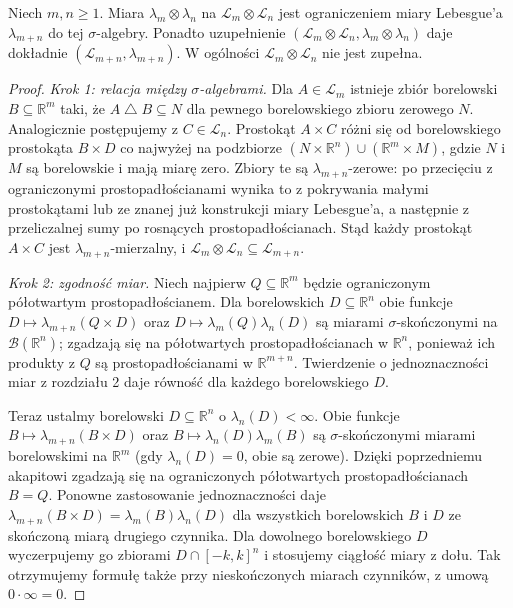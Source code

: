\begin{twierdzenie}
\label{thm:lebesgue-products-12}
Niech $m,n\ge1$. Miara $\lambda_m\otimes\lambda_n$
na $\mathcal L_m\otimes\mathcal L_n$ jest ograniczeniem
miary Lebesgue'a $\lambda_{m+n}$ do tej
$\sigma$-algebry. Ponadto uzupełnienie
$(\mathcal L_m\otimes\mathcal L_n,
\lambda_m\otimes\lambda_n)$ daje dokładnie
$(\mathcal L_{m+n},\lambda_{m+n})$.
W ogólności $\mathcal L_m\otimes\mathcal L_n$
nie jest zupełna.
\end{twierdzenie}
\begin{proof}
\emph{Krok 1: relacja między $\sigma$-algebrami.}
Dla $A\in\mathcal L_m$ istnieje zbiór borelowski
$B\subseteq\mathbb R^m$ taki, że
$A\mathbin\triangle B\subseteq N$ dla pewnego
borelowskiego zbioru zerowego $N$.
Analogicznie postępujemy z $C\in\mathcal L_n$.
Prostokąt $A\times C$ różni się od
borelowskiego prostokąta $B\times D$ co najwyżej
na podzbiorze
$(N\times\mathbb R^n)\cup(\mathbb R^m\times M)$,
gdzie $N$ i $M$ są borelowskie i mają miarę zero.
Zbiory te są $\lambda_{m+n}$-zerowe:
po przecięciu z ograniczonymi prostopadłościanami
wynika to z pokrywania małymi prostokątami
lub ze znanej już konstrukcji miary Lebesgue'a,
a następnie z przeliczalnej sumy po rosnących
prostopadłościanach. Stąd każdy prostokąt
$A\times C$ jest $\lambda_{m+n}$-mierzalny,
i $\mathcal L_m\otimes\mathcal L_n\subseteq\mathcal L_{m+n}$.

\emph{Krok 2: zgodność miar.}
Niech najpierw $Q\subseteq\mathbb R^m$ będzie ograniczonym
półotwartym prostopadłościanem. Dla borelowskich
$D\subseteq\mathbb R^n$ obie funkcje
$D\mapsto\lambda_{m+n}(Q\times D)$ oraz
$D\mapsto\lambda_m(Q)\lambda_n(D)$ są miarami
$\sigma$-skończonymi na $\mathcal B(\mathbb R^n)$;
zgadzają się na półotwartych prostopadłościanach
w $\mathbb R^n$, ponieważ ich produkty z $Q$ są
prostopadłościanami w $\mathbb R^{m+n}$.
Twierdzenie o jednoznaczności miar z rozdziału 2
daje równość dla każdego borelowskiego $D$.

Teraz ustalmy borelowski $D\subseteq\mathbb R^n$
o $\lambda_n(D)<\infty$. Obie funkcje
$B\mapsto\lambda_{m+n}(B\times D)$ oraz
$B\mapsto\lambda_n(D)\lambda_m(B)$ są
$\sigma$-skończonymi miarami borelowskimi na
$\mathbb R^m$ (gdy $\lambda_n(D)=0$, obie są
zerowe). Dzięki poprzedniemu akapitowi zgadzają
się na ograniczonych półotwartych prostopadłościanach
$B=Q$. Ponowne zastosowanie jednoznaczności
daje $\lambda_{m+n}(B\times D)=\lambda_m(B)\lambda_n(D)$
dla wszystkich borelowskich $B$ i $D$ ze
skończoną miarą drugiego czynnika. Dla dowolnego
borelowskiego $D$ wyczerpujemy go zbiorami
$D\cap[-k,k]^n$ i stosujemy ciągłość miary z dołu.
Tak otrzymujemy formułę także przy nieskończonych
miarach czynników, z umową $0\cdot\infty=0$.


\end{proof}
